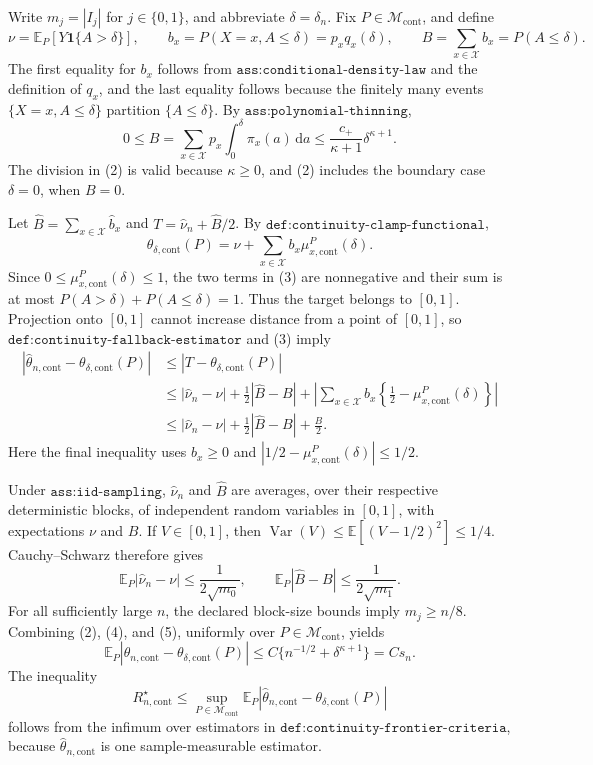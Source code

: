 Write \(m_j=|I_j|\) for \(j\in\{0,1\}\), and abbreviate \(\delta=\delta_n\).  Fix \(P\in\mathcal M_{\mathrm{cont}}\), and define
\[
 \nu=\mathbb E_P[Y\mathbf 1\{A>\delta\}],\qquad
 b_x=P(X=x,A\leq\delta)=p_xq_x(\delta),\qquad
 B=\sum_{x\in\mathcal X}b_x=P(A\leq\delta).
 \tag{1}
\]
The first equality for \(b_x\) follows from \(\texttt{ass:conditional-density-law}\) and the definition of \(q_x\), and the last equality follows because the finitely many events \(\{X=x,A\leq\delta\}\) partition \(\{A\leq\delta\}\).  By \(\texttt{ass:polynomial-thinning}\),
\[
 0\leq B
 =\sum_{x\in\mathcal X}p_x\int_0^\delta\pi_x(a)\,\mathrm da
 \leq \frac{c_+}{\kappa+1}\delta^{\kappa+1}.
 \tag{2}
\]
The division in (2) is valid because \(\kappa\geq0\), and (2) includes the boundary case \(\delta=0\), when \(B=0\).

Let \(\widehat B=\sum_{x\in\mathcal X}\widehat b_x\) and \(T=\widehat\nu_n+\widehat B/2\).  By \(\texttt{def:continuity-clamp-functional}\),
\[
 \theta_{\delta,\mathrm{cont}}(P)
 =\nu+\sum_{x\in\mathcal X}b_x\mu_{x,\mathrm{cont}}^P(\delta).
 \tag{3}
\]
Since \(0\leq\mu_{x,\mathrm{cont}}^P(\delta)\leq1\), the two terms in (3) are nonnegative and their sum is at most
\(P(A>\delta)+P(A\leq\delta)=1\).  Thus the target belongs to \([0,1]\).  Projection onto \([0,1]\) cannot increase distance from a point of \([0,1]\), so \(\texttt{def:continuity-fallback-estimator}\) and (3) imply
\[
\begin{aligned}
 |\widehat\theta_{n,\mathrm{cont}}-\theta_{\delta,\mathrm{cont}}(P)|
 &\leq |T-\theta_{\delta,\mathrm{cont}}(P)|\\
 &\leq |\widehat\nu_n-\nu|+\frac12|\widehat B-B|
   +\left|\sum_{x\in\mathcal X}b_x
       \left\{\frac12-\mu_{x,\mathrm{cont}}^P(\delta)\right\}\right|\\
 &\leq |\widehat\nu_n-\nu|+\frac12|\widehat B-B|+\frac B2.
\end{aligned}
\tag{4}
\]
Here the final inequality uses \(b_x\geq0\) and
\( |1/2-\mu_{x,\mathrm{cont}}^P(\delta)|\leq1/2\).

Under \(\texttt{ass:iid-sampling}\), \(\widehat\nu_n\) and \(\widehat B\) are averages, over their respective deterministic blocks, of independent random variables in \([0,1]\), with expectations \(\nu\) and \(B\).  If \(V\in[0,1]\), then
\(\operatorname{Var}(V)\leq\mathbb E[(V-1/2)^2]\leq1/4\).  Cauchy--Schwarz therefore gives
\[
 \mathbb E_P|\widehat\nu_n-\nu|\leq\frac1{2\sqrt{m_0}},
 \qquad
 \mathbb E_P|\widehat B-B|\leq\frac1{2\sqrt{m_1}}.
 \tag{5}
\]
For all sufficiently large \(n\), the declared block-size bounds imply \(m_j\geq n/8\).  Combining (2), (4), and (5), uniformly over \(P\in\mathcal M_{\mathrm{cont}}\), yields
\[
 \mathbb E_P|\widehat\theta_{n,\mathrm{cont}}-
       \theta_{\delta,\mathrm{cont}}(P)|
 \leq C\{n^{-1/2}+\delta^{\kappa+1}\}=Cs_n.
 \tag{6}
\]
The inequality
\[
 R_{n,\mathrm{cont}}^\star
 \leq\sup_{P\in\mathcal M_{\mathrm{cont}}}
 \mathbb E_P|\widehat\theta_{n,\mathrm{cont}}-
 \theta_{\delta,\mathrm{cont}}(P)|
 \tag{7}
\]
follows from the infimum over estimators in \(\texttt{def:continuity-frontier-criteria}\), because \(\widehat\theta_{n,\mathrm{cont}}\) is one sample-measurable estimator.

